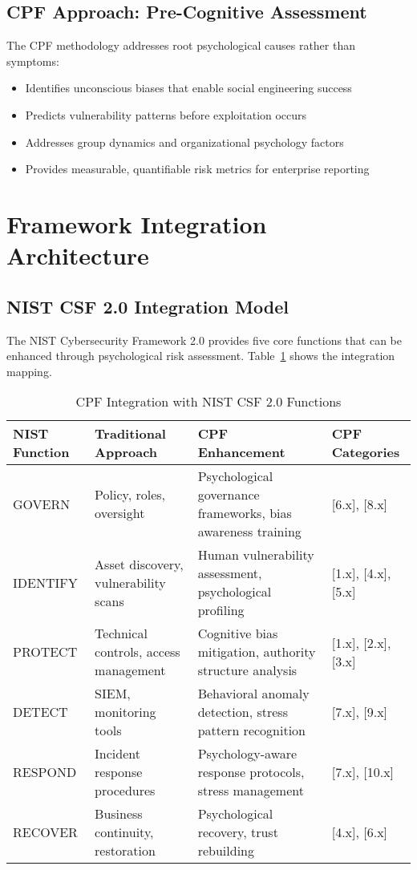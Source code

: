 \documentclass[11pt,a4paper]{article}
\begin{document}
\subsection{CPF Approach: Pre-Cognitive Assessment}

The CPF methodology addresses root psychological causes rather than symptoms:
\begin{itemize}
\item Identifies unconscious biases that enable social engineering success
\item Predicts vulnerability patterns before exploitation occurs
\item Addresses group dynamics and organizational psychology factors
\item Provides measurable, quantifiable risk metrics for enterprise reporting
\end{itemize}

\section{Framework Integration Architecture}

\subsection{NIST CSF 2.0 Integration Model}

The NIST Cybersecurity Framework 2.0 provides five core functions that can be enhanced through psychological risk assessment. Table~\ref{tab:nist-mapping} shows the integration mapping.

\begin{table}[H]
\centering
\caption{CPF Integration with NIST CSF 2.0 Functions}
\label{tab:nist-mapping}
\begin{tabular}{p{3cm}p{4.5cm}p{4.5cm}p{3cm}}
\toprule
\textbf{NIST Function} & \textbf{Traditional Approach} & \textbf{CPF Enhancement} & \textbf{CPF Categories} \\
\midrule
GOVERN & Policy, roles, oversight & Psychological governance frameworks, bias awareness training & [6.x], [8.x] \\
IDENTIFY & Asset discovery, vulnerability scans & Human vulnerability assessment, psychological profiling & [1.x], [4.x], [5.x] \\
PROTECT & Technical controls, access management & Cognitive bias mitigation, authority structure analysis & [1.x], [2.x], [3.x] \\
DETECT & SIEM, monitoring tools & Behavioral anomaly detection, stress pattern recognition & [7.x], [9.x] \\
RESPOND & Incident response procedures & Psychology-aware response protocols, stress management & [7.x], [10.x] \\
RECOVER & Business continuity, restoration & Psychological recovery, trust rebuilding & [4.x], [6.x] \\
\bottomrule
\end{tabular}
\end{table}
\end{document}
